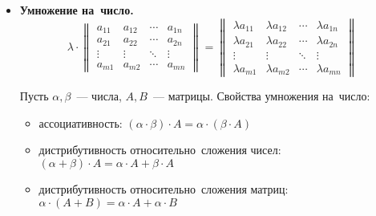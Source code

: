 \begin{itemize}
	\item\textbf{Умножение на~число.}
	\begin{equation*}
	\lambda \cdot
	\begin{Vmatrix}
	a_{11} & a_{12} & \cdots & a_{1n} \\ 
	a_{21} & a_{22} & \cdots & a_{2n} \\ 
	\vdots & \vdots & \ddots & \vdots \\ 
	a_{m1} & a_{m2} & \cdots & a_{mn}
	\end{Vmatrix} =
	\begin{Vmatrix}
	\lambda a_{11} & \lambda a_{12} & \cdots & \lambda a_{1n} \\ 
	\lambda a_{21} & \lambda a_{22} & \cdots & \lambda a_{2n} \\ 
	\vdots & \vdots & \ddots & \vdots \\ 
	\lambda a_{m1} & \lambda a_{m2} & \cdots & \lambda a_{mn}
	\end{Vmatrix}
	\end{equation*}
	
	Пусть $\alpha, \beta$~--- числа, $A, B$~--- матрицы. Свойства умножения на~число:
	\begin{itemize}
		\item ассоциативность:
		$(\alpha \cdot \beta) \cdot A = \alpha \cdot (\beta \cdot A)$
		\item дистрибутивность относительно~сложения чисел:
		$(\alpha + \beta) \cdot A = \alpha \cdot A + \beta \cdot A$
		\item дистрибутивность относительно~сложения матриц:
		$\alpha \cdot (A + B) = \alpha \cdot A + \alpha \cdot B$
	\end{itemize}
	

\end{itemize}
